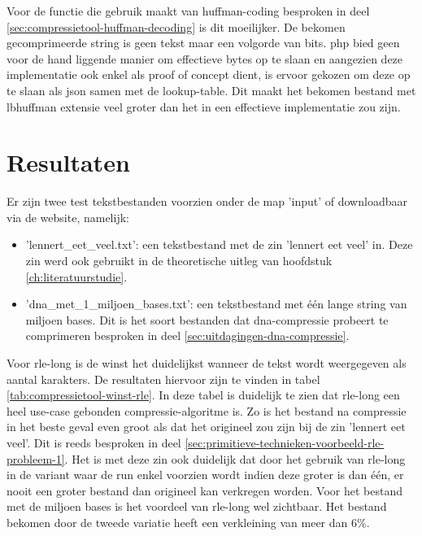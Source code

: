 Voor de functie die gebruik maakt van \gls{huffman-coding} besproken in deel \ref{sec:compressietool-huffman-decoding} is dit moeilijker. De bekomen gecomprimeerde \gls{string} is geen tekst maar een volgorde van \glspl{bit}. \Gls{php} bied geen voor de hand liggende manier om effectieve bytes op te slaan en aangezien deze implementatie ook enkel als proof of concept dient, is ervoor gekozen om deze op te slaan als \gls{json} samen met de \gls{lookup-table}. Dit maakt het bekomen bestand met \gls{lbhuffman} extensie veel groter dan het in een effectieve implementatie zou zijn.

\section{Resultaten}
\label{sec:compressietool-resultaten}

Er zijn twee test tekstbestanden voorzien onder de map 'input' of downloadbaar via de website, namelijk:

\begin{itemize}
	\item 'lennert\_eet\_veel.txt': een tekstbestand met de zin 'lennert eet veel' in. Deze zin werd ook gebruikt in de theoretische uitleg van hoofdstuk \ref{ch:literatuurstudie}.
	
	\item 'dna\_met\_1\_miljoen\_bases.txt': een tekstbestand met één lange \gls{string} van miljoen bases. Dit is het soort bestanden dat \gls{dna-compressie} probeert te comprimeren besproken in deel \ref{sec:uitdagingen-dna-compressie}.
\end{itemize}

Voor \gls{rle-long} is de winst het duidelijkst wanneer de tekst wordt weergegeven als aantal karakters. De resultaten hiervoor zijn te vinden in tabel \ref{tab:compressietool-winst-rle}. In deze tabel is duidelijk te zien dat \gls{rle-long} een heel \gls{use-case} gebonden \gls{compressie-algoritme} is. Zo is het bestand na compressie in het beste geval even groot als dat het origineel zou zijn bij de zin 'lennert eet veel'. Dit is reeds besproken in deel \ref{sec:primitieve-technieken-voorbeeld-rle-probleem-1}. Het is met deze zin ook duidelijk dat door het gebruik van \gls{rle-long} in de variant waar de run enkel voorzien wordt indien deze groter is dan één, er nooit een groter bestand dan origineel kan verkregen worden. Voor het bestand met de miljoen bases is het voordeel van \gls{rle-long} wel zichtbaar. Het bestand bekomen door de tweede variatie heeft een verkleining van meer dan 6\%.

